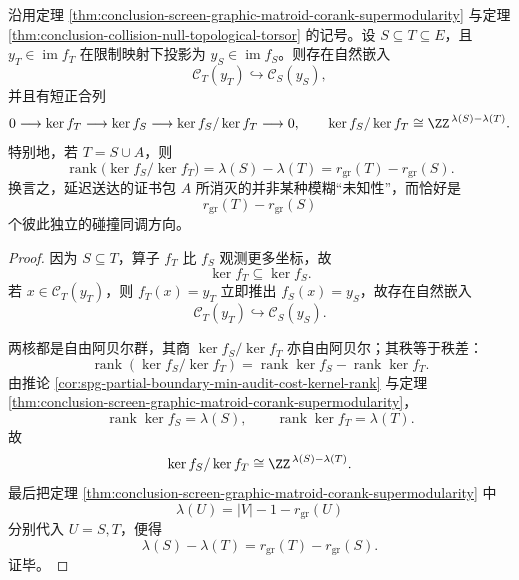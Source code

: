 \begin{theorem}[延迟补全的碰撞扭量商与秩削减律]\label{thm:conclusion-delayed-completion-collision-torsor-rank-law}
沿用定理 \ref{thm:conclusion-screen-graphic-matroid-corank-supermodularity} 与定理 \ref{thm:conclusion-collision-null-topological-torsor} 的记号。设 \(S\subseteq T\subseteq E\)，且 \(y_T\in\operatorname{im}f_T\) 在限制映射下投影为 \(y_S\in\operatorname{im}f_S\)。则存在自然嵌入
\[
\mathcal C_T(y_T)\hookrightarrow \mathcal C_S(y_S),
\]
并且有短正合列
\[
0\longrightarrow \ker f_T\longrightarrow \ker f_S\longrightarrow \ker f_S/\ker f_T\longrightarrow 0,
\qquad
\ker f_S/\ker f_T\cong \ZZ^{\,\lambda(S)-\lambda(T)}.
\]
特别地，若 \(T=S\cup A\)，则
\[
\operatorname{rank}\bigl(\ker f_S/\ker f_T\bigr)
=
\lambda(S)-\lambda(T)
=
r_{\mathrm{gr}}(T)-r_{\mathrm{gr}}(S).
\]
换言之，延迟送达的证书包 \(A\) 所消灭的并非某种模糊“未知性”，而恰好是
\[
r_{\mathrm{gr}}(T)-r_{\mathrm{gr}}(S)
\]
个彼此独立的碰撞同调方向。
\end{theorem}

\begin{proof}
因为 \(S\subseteq T\)，算子 \(f_T\) 比 \(f_S\) 观测更多坐标，故
\[
\ker f_T\subseteq \ker f_S.
\]
若 \(x\in\mathcal C_T(y_T)\)，则 \(f_T(x)=y_T\) 立即推出 \(f_S(x)=y_S\)，故存在自然嵌入
\[
\mathcal C_T(y_T)\hookrightarrow \mathcal C_S(y_S).
\]

两核都是自由阿贝尔群，其商 \(\ker f_S/\ker f_T\) 亦自由阿贝尔；其秩等于秩差：
\[
\operatorname{rank}(\ker f_S/\ker f_T)
=
\operatorname{rank}\ker f_S-\operatorname{rank}\ker f_T.
\]
由推论 \ref{cor:spg-partial-boundary-min-audit-cost-kernel-rank} 与定理 \ref{thm:conclusion-screen-graphic-matroid-corank-supermodularity}，
\[
\operatorname{rank}\ker f_S=\lambda(S),
\qquad
\operatorname{rank}\ker f_T=\lambda(T).
\]
故
\[
\ker f_S/\ker f_T\cong \ZZ^{\,\lambda(S)-\lambda(T)}.
\]
最后把定理 \ref{thm:conclusion-screen-graphic-matroid-corank-supermodularity} 中
\[
\lambda(U)=|V|-1-r_{\mathrm{gr}}(U)
\]
分别代入 \(U=S,T\)，便得
\[
\lambda(S)-\lambda(T)=r_{\mathrm{gr}}(T)-r_{\mathrm{gr}}(S).
\]
证毕。
\end{proof}

\endinput
